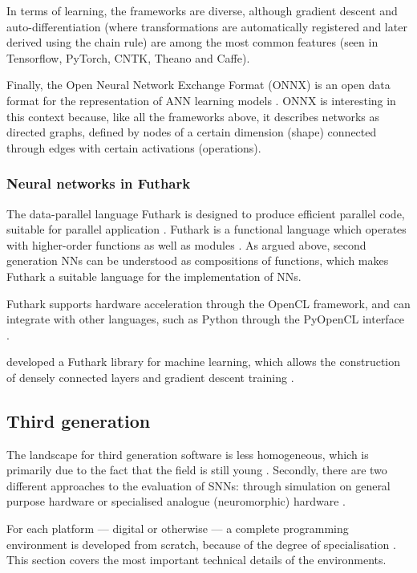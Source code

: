 \documentclass[report.tex]{subfiles}
\begin{document}
In terms of learning, the frameworks are diverse, although gradient descent 
and auto-differentiation (where transformations are automatically registered and 
later derived using the chain rule) are among the most common features 
(seen in Tensorflow, PyTorch, CNTK, Theano and Caffe). 

Finally, the Open Neural Network Exchange Format (ONNX) is an open data format for the representation
of \gls{ANN} learning models \cite{ONNX2018}. 
ONNX is interesting in this context because, like all the frameworks above, it describes 
networks as directed graphs, defined by nodes of a certain dimension (shape) connected through
edges with certain activations (operations).

\subsubsection{Neural networks in Futhark}
The data-parallel language Futhark is designed to produce efficient parallel
code, suitable for parallel application \cite{Henriksen2017, Elsman2018}.
Futhark is a functional language which operates with higher-order functions as
well as modules \cite{Elsman2018b, Hovgaard2018}.
As argued above, second generation \glspl{NN} can be understood as compositions
of functions, which makes Futhark a suitable language for the implementation of
\glspl{NN}. 

Futhark supports hardware acceleration through the \gls{OpenCL} framework,
and can integrate with other languages, such as \gls{Python} through the
PyOpenCL interface \cite{PyOpenCL}.

\citeauthor{Minh2018} developed a Futhark library for machine learning, which 
allows the construction of densely connected layers and gradient descent
training \cite{Minh2018}.

\subsection{Third generation}
The landscape for third generation software is less homogeneous, which is
primarily due to the fact that the field is still young \cite{Maass1997,
Albada2018}.
Secondly, there are two different approaches to the evaluation of \glspl{SNN}:
through simulation on general purpose hardware or specialised analogue
(neuromorphic) hardware \cite{Maass1997, Davison2009, Albada2018}.

For each platform --- digital or otherwise --- a complete programming environment
is developed from scratch, because of the degree of specialisation
\cite{Walter2015, Lin2018}.
This section covers the most important technical details of
the environments.
\end{document}
